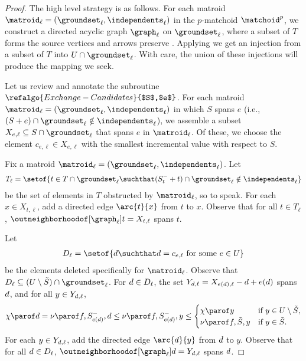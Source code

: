 \documentclass[oneside,letterpaper]{scrartcl} \usepackage{macros}
\newcommand{\mindex}{\ell}
\newcommand{\pmatchoid}{\matchoid^p} \newcommand{\defpmatchoid}{\pmatchoid = (\groundset,\independents)} \newcommand{\matroidI}{\matroid_{\mindex}} \newcommand{\groundsetI}{\groundset_{\mindex}} \newcommand{\independentsI}{\independents_{\mindex}} \newcommand{\defmatroidI}{\matroidI = (\groundsetI,\independentsI)} \newcommand{\offlineratio}{\gamma_p} \newcommand{\optset}{T^*}
\begin{document}
\begin{proof}
  The high level strategy is as follows. For each matroid
  $\defmatroidI$ in the $p$-matchoid $\pmatchoid$, we construct a
  directed acyclic graph $\graph_{\mindex}$ on $\groundsetI$, where a
  subset of $T$ forms the source vertices and arrows preserve
  . Applying
   we get an injection from a subset
  of $T$ into $U \cap \groundsetI$. With care, the union of these
  injections will produce the mapping we seek.

  Let us review and annotate the subroutine
  $\refalgo{Exchange-Candidates}{$S$,$e$}$. For each matroid
  $\defmatroidI$ in which $S$ spans $e$ (i.e., $(S + e) \cap
  \groundsetI \notin \independentsI$), we assemble a subset
  $X_{e,\mindex} \subseteq S \cap \groundsetI$ that spans $e$ in
  $\matroidI$. Of these, we choose the element $c_{e,\mindex} \in
  X_{e,\mindex}$ with the smallest incremental value with respect to
  $S$.

  Fix a matroid $\defmatroidI$. Let
  \begin{align*}
    T_{\mindex} = \setof{t \in T \cap \groundsetI \suchthat (\setbefore{t} + t) \cap \groundsetI \notin \independentsI }
  \end{align*}
  be the set of elements in $T$ obstructed by $\matroidI$, so to
  speak. For each $x \in X_{t, \mindex}$, add a directed edge
  $\arc{t}{x}$ from $t$ to $x$. Observe that for all $t \in
  T_{\mindex}$, $\outneighborhoodof[\graph_{\mindex}]{t} = X_{t,
    \mindex}$ spans $t$.

  Let
  \begin{align*}
    D_{\mindex} = \setof{\deleted \suchthat d = c_{e,\mindex} \text{ for some } e
      \in U}
  \end{align*}
  be the elements deleted specifically for $\matroidI$.  Observe that
  $D_{\mindex} \subseteq (\deleteds) \cap \groundsetI$. For $\deleted
  \in D_{\mindex} $, the set $Y_{\deleted,\mindex} =
  X_{\replacement,\mindex} - \deleted + \replacement$ spans
  $d$, and for all $y \in Y_{\deleted,\mindex}$,
  \begin{align*}
    \exitvalueof{\deleted} = \incvalueof{f}{\setbefore{\replacement}}{\deleted} \leq \incvalueof{f}{\setbefore{\replacement}}{y} \leq \begin{cases}
      \exitvalueof{y} & \text{if } y \in \deleteds, \\
      \incvalueof{f}{\finalset}{y} & \text{if }y \in \finalset.
    \end{cases}
  \end{align*}
  For each $y \in Y_{\deleted,\mindex}$, add the directed edge
  $\arc{\deleted}{y}$ from $d$ to $y$. Observe that for all
  $\deleted \in D_{\mindex}$,
  $\outneighborhoodof[\graph_{\mindex}]{\deleted} =
  Y_{\deleted,\mindex}$ spans $d$.


\end{proof}
\end{document}
